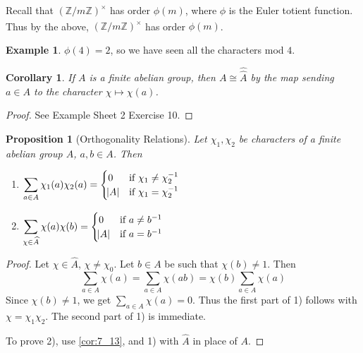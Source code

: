 \documentclass[11pt]{article}
\theoremstyle{definition}
\newtheorem{example}[definition]{Example}
\theoremstyle{plain}
\newtheorem{proposition}[definition]{Proposition}
\newtheorem{corollary}[definition]{Corollary}
\theoremstyle{remark}
\newcommand{\ZZ}{\mathbb{Z}}
\begin{document}
Recall that $(\ZZ/m\ZZ)^\times$ has order $\phi(m)$, where $\phi$ is the Euler totient function. Thus by the above, $\widehat{(\ZZ/m\ZZ)^\times}$ has order $\phi(m)$.

\begin{example}\label{eg:7_12}
    $\phi(4) = 2$, so we have seen all the characters mod $4$.
\end{example}

\begin{corollary}\label{cor:7_13}
    If $A$ is a finite abelian group, then $A \cong \hat{\hat{A}}$ by the map sending $a \in A$ to the character $\chi \mapsto \chi(a)$.
\end{corollary}
\begin{proof}
    See Example Sheet 2 Exercise 10.
\end{proof}

\begin{proposition}[Orthogonality Relations]\label{prop:7_14}
    Let $\chi_1, \chi_2$ be characters of a finite abelian group $A$, $a, b \in A$. Then
    \begin{enumerate}
        \item $\displaystyle\sum_{a \in A} \chi_1(a) \chi_2(a) =
                \begin{cases}
                    0 & \text{if } \chi_1 \neq \chi_2^{-1}\\
                    \abs{A} & \text{if } \chi_1 = \chi_2^{-1}
                \end{cases}$
        \item $\displaystyle\sum_{\chi \in \widehat{A}} \chi(a) \chi(b) =
                \begin{cases}
                    0 & \text{if } a \neq b^{-1}\\
                    \abs{A} & \text{if } a = b^{-1}
                \end{cases}$
    \end{enumerate}
\end{proposition}
\begin{proof}
    Let $\chi \in \widehat{A}$, $\chi \neq \chi_0$. Let $b \in A$ be such that $\chi(b) \neq 1$. Then
    \begin{equation*}
        \sum_{a \in A} \chi(a) = \sum_{a \in A} \chi(ab) = \chi(b) \sum_{a \in A} \chi(a)
    \end{equation*}
    Since $\chi(b) \neq 1$, we get $\sum_{a \in A} \chi(a) = 0$. Thus the first part of 1) follows with $\chi = \chi_1 \chi_2$. The second part of 1) is immediate.

    To prove 2), use \autoref{cor:7_13}, and 1) with $\widehat{A}$ in place of $A$.
\end{proof}
\end{document}
